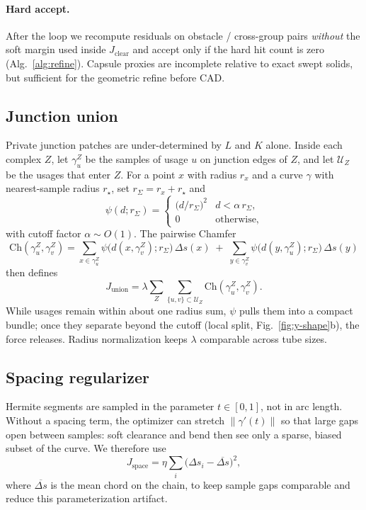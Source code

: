 \paragraph{Hard accept.}
After the loop we recompute residuals on obstacle / cross-group pairs
\emph{without} the soft margin used inside $J_{\mathrm{clear}}$ and accept only
if the hard hit count is zero (Alg.~\ref{alg:refine}).
Capsule proxies are incomplete relative to exact swept solids, but sufficient
for the geometric refine before CAD.

\subsection{Junction union}
\label{sec:costs:union}

Private junction patches are under-determined by $L$ and $K$ alone.
Inside each complex $Z$, let $\gamma_u^{Z}$ be the samples of usage $u$ on
junction edges of $Z$, and let $\mathcal{U}_Z$ be the usages that enter $Z$.
For a point $x$ with radius $r_x$ and a curve $\gamma$ with nearest-sample
radius $r_\star$, set $r_{\Sigma}=r_x+r_\star$ and
\begin{equation}
\psi(d;r_{\Sigma})
=
\begin{cases}
\displaystyle\bigl(d/r_{\Sigma}\bigr)^{2}
  & d < \alpha\, r_{\Sigma}, \\[0.4em]
0 & \text{otherwise,}
\end{cases}
\end{equation}
with cutoff factor $\alpha\sim O(1)$.
The pairwise Chamfer
\begin{equation}
\mathrm{Ch}(\gamma_u^{Z},\gamma_v^{Z})
=
\sum_{x\in\gamma_u^{Z}}
\psi\big(d(x,\gamma_v^{Z});r_{\Sigma}\big)\,\Delta s(x)
\;+\;
\sum_{y\in\gamma_v^{Z}}
\psi\big(d(y,\gamma_u^{Z});r_{\Sigma}\big)\,\Delta s(y)
\end{equation}
then defines
\begin{equation}
J_{\mathrm{union}}
=
\lambda
\sum_{Z}
\sum_{\{u,v\}\subset\mathcal{U}_Z}
\mathrm{Ch}(\gamma_u^{Z},\gamma_v^{Z}).
\end{equation}
While usages remain within about one radius sum, $\psi$ pulls them into a
compact bundle; once they separate beyond the cutoff (local split,
Fig.~\ref{fig:y-shape}b), the force releases.
Radius normalization keeps $\lambda$ comparable across tube sizes.

\subsection{Spacing regularizer}
\label{sec:costs:space}

Hermite segments are sampled in the parameter $t\in[0,1]$, not in arc length.
Without a spacing term, the optimizer can stretch $\|\gamma'(t)\|$ so that large
gaps open between samples: soft clearance and bend then see only a sparse,
biased subset of the curve.
We therefore use
\begin{equation}
J_{\mathrm{space}}
=
\eta
\sum_{i}
\big(\Delta s_i-\overline{\Delta s}\big)^{2},
\end{equation}
where $\overline{\Delta s}$ is the mean chord on the chain, to keep sample gaps
comparable and reduce this parameterization artifact.
